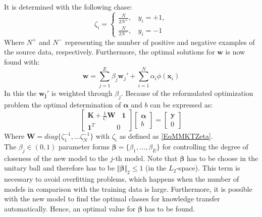 It is determined with the following chase:\cite{Tommasi.}
\begin{equation}\label{EqMMKTZeta}
	\zeta_i = \begin{cases}
			\frac{N}{2N^+}, \>\>\>\> y_i = +1,\\
			\frac{N}{2N^-}, \>\>\>\> y_i = -1
	\end{cases}
\end{equation} 
Where $N^+$ and $N^-$ representing the number of positive and negative examples of the source data, respectively.
Furthermore, the optimal solutions for $\mathbf{w}$ is now found with:\cite{Tommasi.}
\begin{equation}
	\mathbf{w} = \sum_{j=1}^{E}\beta_j\mathbf{w}_j'+\sum_{i=1}^{N}\alpha_i\phi(\mathbf{x}_i)
\end{equation}
In this the $\mathbf{w_j}'$ is weighted through $\beta_j$.
Because of the reformulated optimization problem the optimal determination of $\boldsymbol{\alpha}$ and $b$ can be expressed as:\cite{Tommasi.}
\begin{equation}\label{EqMMKTParaEst}
\begin{bmatrix}
\mathbf{K}+\frac{1}{C}\mathbf{W} \>\>\>\> \mathbf{1}\\
\mathbf{1}^T \>\>\>\>\>\>\>\>\>\>\>\>\>\> 0
\end{bmatrix}
\begin{bmatrix}
\boldsymbol{\alpha}\\
b
\end{bmatrix}
= 
\begin{bmatrix}
\mathbf{y} \\
0
\end{bmatrix}
\end{equation}
Where $\mathbf{W} = diag\{\zeta_1^{-1},\dots\zeta_N^{-1}\}$ with $\zeta_i$ as defined as \eqref{EqMMKTZeta}.\\
The $\beta_j \in (0,1)$ parameter forms $\boldsymbol{\beta} = \{\beta_1,\dots,\beta_E \}$ for controlling the degree of closeness of the new model to the $j$-th model.
Note that $\boldsymbol{\beta}$ has to be choose in the unitary ball and therefore has to be $\Vert\boldsymbol{\beta}\Vert_2\le 1$ (in the $L_2$-space).
This term is necessary to avoid overfitting problems, which happens when the number of models in comparison with the training data is large.
Furthermore, it is possible with the new model to find the optimal classes for knowledge transfer automatically.
Hence, an optimal value for $\boldsymbol{\beta}$ has to be found.\cite{Tommasi.}\\
